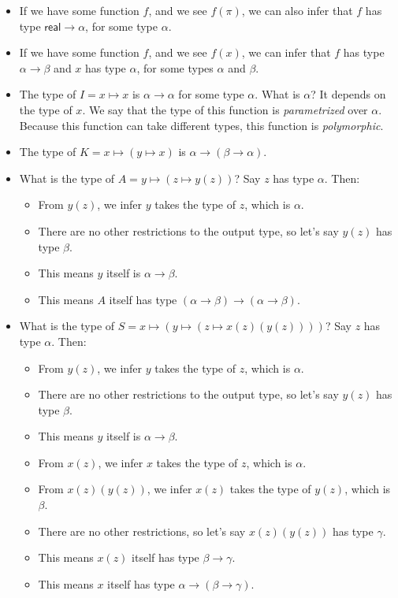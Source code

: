 \documentclass[11pt,paper=letter]{scrartcl}
\renewcommand{\sf}{\mathsf}
\begin{document}
\begin{itemize}[leftmargin=*]
\item If we have some function $f$, and we see $f(\pi)$, we can also infer that $f$ has type $\sf{real} \to \alpha$, for some type $\alpha$.
\item If we have some function $f$, and we see $f(x)$, we can infer that $f$ has type $\alpha \to \beta$ and $x$ has type $\alpha$, for some types $\alpha$ and $\beta$.
\item The type of $I = x \mapsto x$ is $\alpha \to \alpha$ for some type $\alpha$. What is $\alpha$? It depends on the type of $x$. We say that the type of this function is \emph{parametrized} over $\alpha$. Because this function can take different types, this function is \emph{polymorphic}.
\item The type of $K = x \mapsto (y \mapsto x)$ is $\alpha \to (\beta \to \alpha)$.
\item What is the type of $A = y \mapsto (z \mapsto y(z))$? Say $z$ has type $\alpha$. Then:
\begin{itemize}
\item From $y(z)$, we infer $y$ takes the type of $z$, which is $\alpha$.
\item There are no other restrictions to the output type, so let's say $y(z)$ has type $\beta$.
\item This means $y$ itself is $\alpha \to \beta$.
\item This means $A$ itself has type $(\alpha \to \beta) \to (\alpha \to \beta)$.
\end{itemize}
\item What is the type of $S = x \mapsto \left(y \mapsto \left(z \mapsto x(z)(y(z))\right)\right)$? Say $z$ has type $\alpha$. Then:
\begin{itemize}
\item From $y(z)$, we infer $y$ takes the type of $z$, which is $\alpha$.
\item There are no other restrictions to the output type, so let's say $y(z)$ has type $\beta$.
\item This means $y$ itself is $\alpha \to \beta$.
\item From $x(z)$, we infer $x$ takes the type of $z$, which is $\alpha$.
\item From $x(z)(y(z))$, we infer $x(z)$ takes the type of $y(z)$, which is $\beta$.
\item There are no other restrictions, so let's say $x(z)(y(z))$ has type $\gamma$.
\item This means $x(z)$ itself has type $\beta \to \gamma$.
\item This means $x$ itself has type $\alpha \to (\beta \to \gamma)$.

\end{itemize}
\end{itemize}
\end{document}
